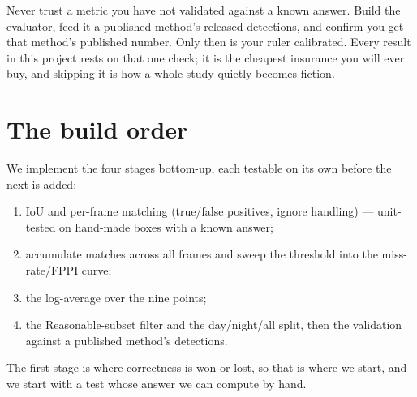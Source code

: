 \documentclass[../main.tex]{subfiles}
\begin{document}
\begin{lesson}
Never trust a metric you have not validated against a known answer. Build the evaluator, feed it
a published method's released detections, and confirm you get that method's published number. Only
then is your ruler calibrated. Every result in this project rests on that one check; it is the
cheapest insurance you will ever buy, and skipping it is how a whole study quietly becomes fiction.
\end{lesson}

\section{The build order}

We implement the four stages bottom-up, each testable on its own before the next is added:
\begin{enumerate}
  \item IoU and per-frame matching (true/false positives, ignore handling) --- unit-tested on
        hand-made boxes with a known answer;
  \item accumulate matches across all frames and sweep the threshold into the miss-rate/FPPI
        curve;
  \item the log-average over the nine points;
  \item the Reasonable-subset filter and the day/night/all split, then the validation against a
        published method's detections.
\end{enumerate}
The first stage is where correctness is won or lost, so that is where we start, and we start with
a test whose answer we can compute by hand.
\end{document}
